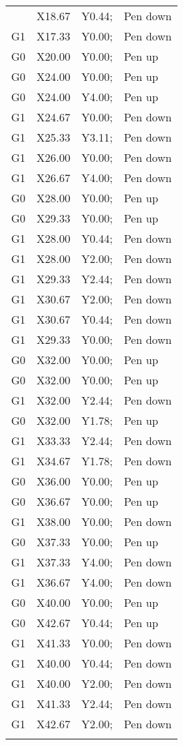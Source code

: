 \begin{longtable}{|>{\raggedright\arraybackslash}m{}|>{\raggedright\arraybackslash}m{}|>{\raggedright\arraybackslash}m{}|>{\raggedright\arraybackslash}m{}|}
\begin{array}{cccl}
    G1 &X18.67 &Y0.44; &Pen down\\
    G1 &X17.33 &Y0.00; &Pen down\\
    G0 &X20.00 &Y0.00; &Pen up\\
    G0 &X24.00 &Y0.00; &Pen up\\
    G0 &X24.00 &Y4.00; &Pen up\\
    G1 &X24.67 &Y0.00; &Pen down\\
    G1 &X25.33 &Y3.11; &Pen down\\
    G1 &X26.00 &Y0.00; &Pen down\\
    G1 &X26.67 &Y4.00; &Pen down\\
    G0 &X28.00 &Y0.00; &Pen up\\
    G0 &X29.33 &Y0.00; &Pen up\\
    G1 &X28.00 &Y0.44; &Pen down\\
    G1 &X28.00 &Y2.00; &Pen down\\
    G1 &X29.33 &Y2.44; &Pen down\\
    G1 &X30.67 &Y2.00; &Pen down\\
    G1 &X30.67 &Y0.44; &Pen down\\
    G1 &X29.33 &Y0.00; &Pen down\\
    G0 &X32.00 &Y0.00; &Pen up\\
    G0 &X32.00 &Y0.00; &Pen up\\
    G1 &X32.00 &Y2.44; &Pen down\\
    G0 &X32.00 &Y1.78; &Pen up\\
    G1 &X33.33 &Y2.44; &Pen down\\
    G1 &X34.67 &Y1.78; &Pen down\\
    G0 &X36.00 &Y0.00; &Pen up\\
    G0 &X36.67 &Y0.00; &Pen up\\
    G1 &X38.00 &Y0.00; &Pen down\\
    G0 &X37.33 &Y0.00; &Pen up\\
    G1 &X37.33 &Y4.00; &Pen down\\
    G1 &X36.67 &Y4.00; &Pen down\\
    G0 &X40.00 &Y0.00; &Pen up\\
    G0 &X42.67 &Y0.44; &Pen up\\
    G1 &X41.33 &Y0.00; &Pen down\\
    G1 &X40.00 &Y0.44; &Pen down\\
    G1 &X40.00 &Y2.00; &Pen down\\
    G1 &X41.33 &Y2.44; &Pen down\\
    G1 &X42.67 &Y2.00; &Pen down\\

\end{array}
\end{longtable}
